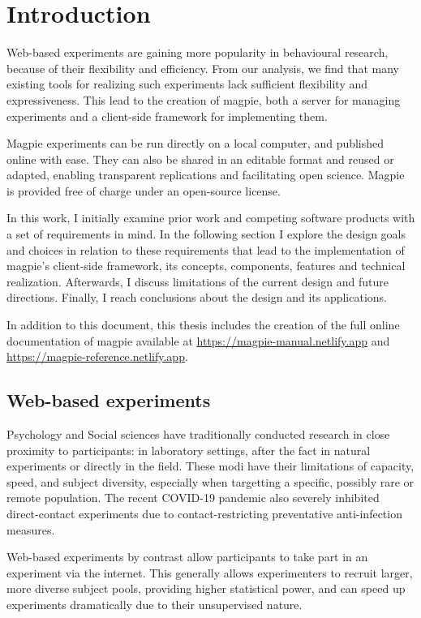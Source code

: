 \documentclass[a4paper,11pt]{scrreprt}
\begin{document}
\tableofcontents
\newpage 


\chapter{Introduction}
Web-based experiments are gaining more popularity in behavioural research, because of their flexibility and efficiency. From our analysis, we find that many existing tools for realizing such experiments lack sufficient flexibility and expressiveness. This lead to the creation of magpie, both a server for managing experiments and a client-side framework for implementing them.

Magpie experiments can be run directly on a local computer, and published online with ease. They can also be shared in an editable format and reused or adapted, enabling transparent replications and facilitating open science. Magpie is provided free of charge under an open-source license.

In this work, I initially examine prior work and competing software products with a set of requirements in mind. In the following section I explore the design goals and choices in relation to these requirements that lead to the implementation of magpie's client-side framework, its concepts, components, features and technical realization. Afterwards, I discuss limitations of the current design and future directions. Finally, I reach conclusions about the design and its applications.

In addition to this document, this thesis includes the creation of the full online documentation of magpie available at \url{https://magpie-manual.netlify.app} and \url{https://magpie-reference.netlify.app}.

\section{Web-based experiments}
Psychology and Social sciences have traditionally conducted research in close proximity to participants: in laboratory settings, after the fact in natural experiments or directly in the field. These modi have their limitations of capacity, speed, and subject diversity, especially when targetting a specific, possibly rare or remote population. The recent COVID-19 pandemic also severely inhibited direct-contact experiments due to contact-restricting preventative anti-infection measures.

Web-based experiments by contrast allow participants to take part in an experiment via the internet. This generally allows experimenters to recruit larger, more diverse subject pools, providing higher statistical power, and can speed up experiments dramatically due to their unsupervised nature.
\end{document}
